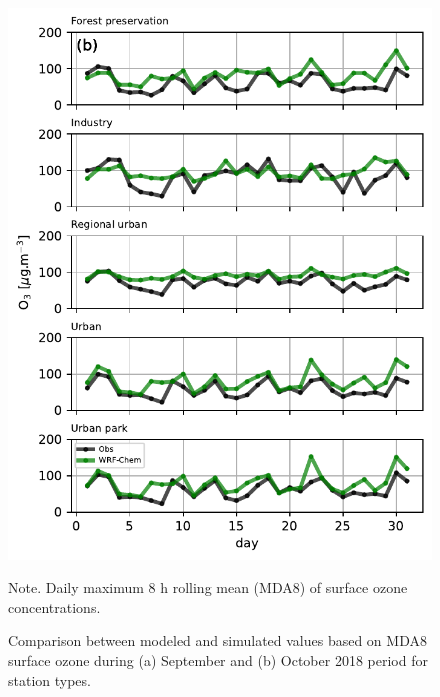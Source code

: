 \begin{figure}[!ht]
\begin{center}
\begin{minipage}{.49\linewidth}
    \includegraphics[width=\linewidth]{fig/MDA8_type_oct18}
  \end{minipage}
  \end{center}
  \caption{Comparison between modeled and simulated values based on MDA8 surface ozone during (a) September and (b) October 2018 period for station types.}
  {\scriptsize Note. Daily maximum 8 h rolling mean (MDA8) of surface ozone concentrations.}
  \label{fig: MDA8_type_current}
\end{figure}

